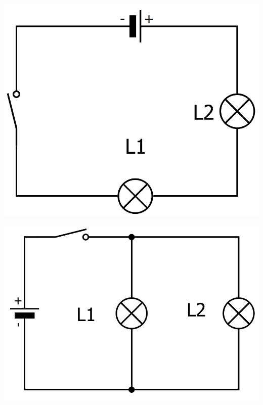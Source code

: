 \documentclass[12pt,a4paper]{article}
\begin{document}
\begin{multicols}{2}
	\begin{center}
		\includegraphics[scale=0.25]{img/serie}
	\end{center}
	
	\begin{center}
		\includegraphics[scale=0.25]{img/drv}
	\end{center}
\end{multicols}
\end{document}
